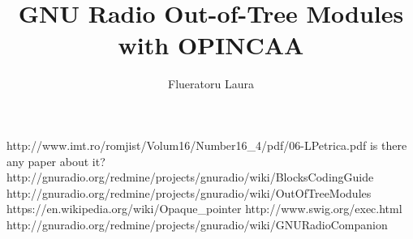 \documentclass[a4paper,11pt]{article}
\begin{document}
\title{GNU Radio Out-of-Tree Modules with OPINCAA}
\author{Flueratoru Laura}
\date{}
\maketitle








\begin{thebibliography}{1}
   http://www.imt.ro/romjist/Volum16/Number16\_4/pdf/06-LPetrica.pdf
   is there any paper about it?
   http://gnuradio.org/redmine/projects/gnuradio/wiki/BlocksCodingGuide
   http://gnuradio.org/redmine/projects/gnuradio/wiki/OutOfTreeModules
   https://en.wikipedia.org/wiki/Opaque\_pointer
   http://www.swig.org/exec.html
   http://gnuradio.org/redmine/projects/gnuradio/wiki/GNURadioCompanion
\end{thebibliography}
\end{document}
